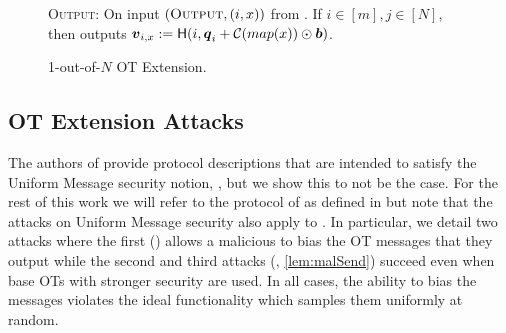\begin{figure}[t!]
{\begin{minipage}{0.95\linewidth}
			
			\textsc{Output:} On input $(\textsc{Output}, (i,x))$ from \send. If $i\in[m],j\in[N]$, then \send outputs $\boldsymbol{v}_{i,x}:=\mathsf{H}(i,\boldsymbol{q}_i+\mathcal{C}(map(x))\odot \boldsymbol{b})$.
	\end{minipage}}
	\caption{ 1-out-of-$N$ OT Extension.}
	\label{fig:otExt}
\end{figure}


%			


\subsection{OT Extension Attacks}\label{sec:extAttack}

The authors of \cite{C:KelOrsSch15,RSA:OrrOrsSch17} provide protocol descriptions that are intended to satisfy the Uniform Message security notion, , but we show this to not be the case. For the rest of this work we will refer to the protocol of \cite{RSA:OrrOrsSch17} as defined in  but note that the attacks on Uniform Message security also apply to \cite[Figure 6, 7]{C:KelOrsSch15}. In particular, we detail two attacks where the first ()  allows a malicious \rec to bias the OT messages that they output while the second and third attacks (, \ref{lem:malSend}) succeed even when base OTs with stronger security are used. In all cases, the ability to bias the messages violates the ideal functionality which samples them uniformly at random.


